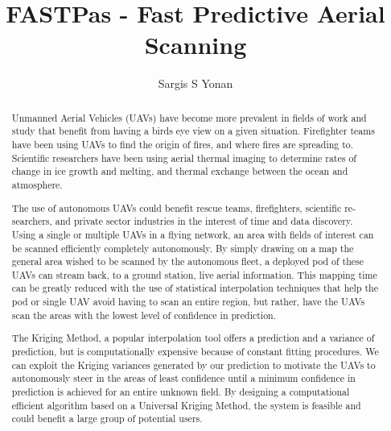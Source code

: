\documentclass[11pt]{ucthesis}
\begin{document}

\title{FASTPas - Fast Predictive Aerial Scanning}
\author{Sargis S Yonan}
\deanlinethree{}

\begin{frontmatter}

\maketitle
\copyrightpage

\tableofcontents
\listoffigures
\listoftables

\begin{abstract}

Unmanned Aerial Vehicles (UAVs) have become more prevalent in fields of work and study that benefit from having a birds eye view on a given situation. Firefighter teams have been using UAVs to find the origin of fires, and where fires are spreading to. Scientific researchers have been using aerial thermal imaging to determine rates of change in ice growth and melting, and thermal exchange between the ocean and atmosphere.
\par
The use of autonomous UAVs could benefit rescue teams, firefighters, scientific re- searchers, and private sector industries in the interest of time and data discovery. Using a single or multiple UAVs in a flying network, an area with fields of interest can be scanned efficiently completely autonomously. By simply drawing on a map the general area wished to be scanned by the autonomous fleet, a deployed pod of these UAVs can stream back, to a ground station, live aerial information. This mapping time can be greatly reduced with the use of statistical interpolation techniques that help the pod or single UAV avoid having to scan an entire region, but rather, have the UAVs scan the areas with the lowest level of confidence in prediction.
\par
The Kriging Method, a popular interpolation tool offers a prediction and a variance of prediction, but is computationally expensive because of constant fitting procedures. We can exploit the Kriging variances generated by our prediction to motivate the UAVs to autonomously steer in the areas of least confidence until a minimum confidence in prediction is achieved for an entire unknown field. By designing a computational efficient algorithm based on a Universal Kriging Method, the system is feasible and could benefit a large group of potential users.
\end{abstract}


\end{frontmatter}
\end{document}
